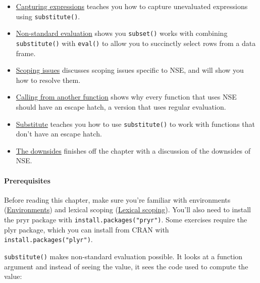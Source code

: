 \begin{itemize}
\item
  \hyperref[capturing-expressions]{Capturing expressions} teaches you
  how to capture unevaluated expressions using \texttt{substitute()}.
\item
  \hyperref[subset]{Non-standard evaluation} shows you \texttt{subset()}
  works with combining \texttt{substitute()} with \texttt{eval()} to
  allow you to succinctly select rows from a data frame.
\item
  \hyperref[scoping-issues]{Scoping issues} discusses scoping issues
  specific to NSE, and will show you how to resolve them.
\item
  \hyperref[calling-from-another-function]{Calling from another
  function} shows why every function that uses NSE should have an escape
  hatch, a version that uses regular evaluation.
\item
  \hyperref[substitute]{Substitute} teaches you how to use
  \texttt{substitute()} to work with functions that don't have an escape
  hatch.
\item
  \hyperref[nse-downsides]{The downsides} finishes off the chapter with
  a discussion of the downsides of NSE.
\end{itemize}

\paragraph{Prerequisites}

Before reading this chapter, make sure you're familiar with environments
(\hyperref[environments]{Environments}) and lexical scoping
(\hyperref[lexical-scoping]{Lexical scoping}). You'll also need to
install the pryr package with \texttt{install.packages("pryr")}. Some
exercises require the plyr package, which you can install from CRAN with
\texttt{install.packages("plyr")}.


\texttt{substitute()} makes non-standard evaluation possible. It looks
at a function argument and instead of seeing the value, it sees the code
used to compute the value: 

\begin{Shaded}
\begin{Highlighting}[]
\StringTok{ }
\NormalTok{\}}
\NormalTok{(}\NormalTok{:}\NormalTok{)}

\StringTok{ }

\StringTok{ }
\StringTok{ }\NormalTok{)}
\end{Highlighting}
\end{Shaded}


